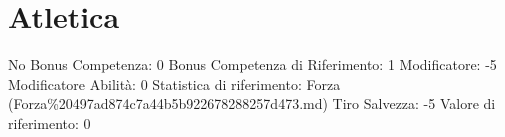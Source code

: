 \section{Atletica}\label{atletica}

\begin{description}
\tightlist
\item[Tags: ABI]
No Bonus Competenza: 0 Bonus Competenza di Riferimento: 1 Modificatore:
-5 Modificatore Abilità: 0 Statistica di riferimento: Forza
(Forza\%20497ad874c7a44b5b922678288257d473.md) Tiro Salvezza: -5 Valore
di riferimento: 0
\end{description}
